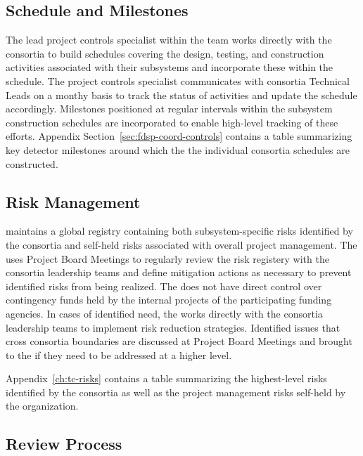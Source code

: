  
\subsection{Schedule and Milestones}

The lead project controls specialist within the  team works
directly with the  consortia to build schedules covering
the design, testing, and construction activities associated with their
subsystems and incorporate these within the  schedule.
The project controls specialist communicates with consortia Technical
Leads on a monthy basis to track the status of activities and update
the  schedule accordingly.  Milestones positioned at regular
intervals within the subsystem construction schedules are incorporated
to enable high-level tracking of these efforts.  Appendix Section~\ref{sec:fdsp-coord-controls}
contains a table summarizing key detector milestones around which the
the individual consortia schedules are constructed.

\subsection{Risk Management}

  maintains a global registry containing both
subsystem-specific risks identified by the consortia and self-held
risks associated with overall  project management.  The
 uses Project Board Meetings to regularly review the
risk registery with the consortia leadership teams and define
mitigation actions as necessary to prevent identified risks from being
realized.  The  does not have direct control over
contingency funds held by the internal projects of the participating
funding agencies.  In cases of identified need, the 
works directly with the consortia leadership teams to implement risk
reduction strategies.  Identified issues that cross consortia
boundaries are discussed at Project Board Meetings and brought to the
  if they need to be addressed at a higher
level.

Appendix~\ref{ch:tc-risks} contains a table summarizing the highest-level
risks identified by the consortia as well as the project management
risks self-held by the  organization.


\subsection{Review Process}

